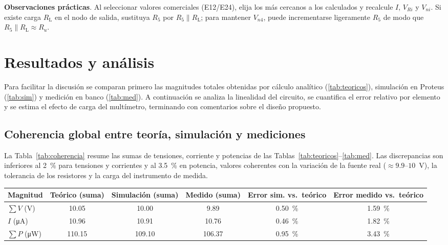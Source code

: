 \documentclass[conference]{IEEEtran}
\begin{document}
\begin{enumerate}[label=\alph*)]
\textbf{Observaciones prácticas}. Al seleccionar valores comerciales (E12/E24), elija los más cercanos a los calculados y recalcule $I$, $V_{Ri}$ y $V_{ni}$. Si existe carga $R_\mathrm{L}$ en el nodo de salida, sustituya $R_5$ por $R_5\parallel R_\mathrm{L}$; para mantener $V_{n4}$, puede incrementarse ligeramente $R_5$ de modo que $R_5\parallel R_\mathrm{L}\approx R_u$.

\end{enumerate}

\section{Resultados y análisis}
Para facilitar la discusión se comparan primero las magnitudes totales obtenidas por cálculo analítico (\ref{tab:teoricos}), simulación en Proteus (\ref{tab:sim}) y medición en banco (\ref{tab:med}).  A continuación se analiza la linealidad del circuito, se cuantifica el error relativo por elemento y se estima el efecto de carga del multímetro, terminando con comentarios sobre el diseño propuesto.

\subsection{Coherencia global entre teoría, simulación y mediciones}
La Tabla~\ref{tab:coherencia} resume las sumas de tensiones, corriente y potencias de las Tablas~\ref{tab:teoricos}--\ref{tab:med}.  Las discrepancias son inferiores al 2~\% para tensiones y corrientes y al 3.5~\% en potencia, valores coherentes con la variación de la fuente real (\mbox{$\approx\!9.9$--$10$~V}), la tolerancia de los resistores y la carga del instrumento de medida\cite{ref:guia}.

\begin{table*}[t]
  \centering
  \begin{tabular}{@{}lccccc@{}}
    \toprule
    Magnitud & Teórico (suma) & Simulación (suma) & Medido (suma) & Error sim. vs.~teórico & Error medido vs.~teórico \\
    \midrule
    $\sum V$ (V) & 10.05 & 10.00 & 9.89 & 0.50~\% & 1.59~\% \\
    $I$ (\si{\micro A}) & 10.96 & 10.91 & 10.76 & 0.46~\% & 1.82~\% \\
    $\sum P$ (\si{\micro W}) & 110.15 & 109.10 & 106.37 & 0.95~\% & 3.43~\% \\
    \bottomrule
  \end{tabular}
  \caption{Comparación de magnitudes totales obtenidas teóricamente, por simulación y mediante medición en banco.}
  \label{tab:coherencia}
\end{table*}
\end{document}
